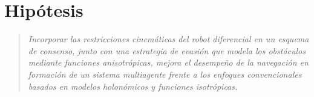 \section{Hipótesis}
\vspace{1.0cm}
\begin{quote}
\textit{Incorporar las restricciones cinemáticas del robot diferencial en un esquema de consenso, junto con una estrategia de evasión que modela los obstáculos mediante funciones anisotrópicas, mejora el desempeño de la navegación en formación de un sistema multiagente frente a los enfoques convencionales basados en modelos holonómicos y funciones isotrópicas.}
\end{quote}
